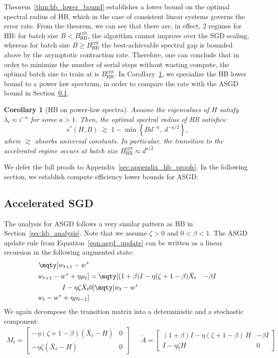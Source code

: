 \documentclass{article}
\def\w{{\mathbf{w}}}
\def\I{\mathbf{I}}
\newtheorem{corollary}{Corollary}
\begin{document}
Theorem~\ref{thm:hb_lower_bound} establishes a lower bound on the optimal spectral radius of HB, which in the case of consistent linear systems governs the error rate. From the theorem, we can see that there are, in effect, $2$ regimes for HB: for batch size $B < B_{\mathrm{HB}}^{\mathrm{crit}}$, the algorithm cannot improve over the SGD scaling, whereas for batch size $B \geq B_{\mathrm{HB}}^{\mathrm{crit}}$ the best-achievable spectral gap is bounded above by the asymptotic contraction rate. Therefore, one can conclude that in order to minimize the number of serial steps without wasting compute, the optimal batch size to train at is $B_{\mathrm{HB}}^{\mathrm{crit}}$. In Corollary~\ref{cor:hb_power_law}, we specialize the HB lower bound to a power law spectrum, in order to compare the rate with the ASGD bound in Section~\ref{sec:asgd_analysis}.
\begin{corollary}[HB on power-law spectra]
\label{cor:hb_power_law}
Assume the eigenvalues of $H$ satisfy $\lambda_i \eqsim i^{-a}$ for some $a>1$. Then, the optimal spectral radius of HB satisfies:
\[
s^*(H,B)
\;\gtrsim\;
1 - \min\!\left\{
B d^{-a},\ d^{-a/2}
\right\},
\]
where $\gtrsim$ absorbs universal constants.
In particular, the transition to the accelerated regime occurs at batch size $
B_{\mathrm{HB}}^{\mathrm{crit}}
\eqsim
d^{a/2}$
\end{corollary}
We defer the full proofs to Appendix~\ref{sec:appendix_hb_proofs}. In the following section, we establish compute efficiency lower bounds for ASGD.
\subsection{Accelerated SGD}
\label{sec:asgd_analysis}
The analysis for ASGD follows a very similar pattern as HB in Section~\ref{sec:hb_analysis}. 
Note that we assume $\zeta>0$ and $0 < \beta < 1$. The ASGD update rule from Equation~\ref{eqn:asgd_update} can be written as a linear recursion in the following augmented state:
\begin{align}
\label{eqn:rec_vec_asgd}
    \mqty[w_{t+1} - w^* \\w_{t+1} - w^* + \eta \mu_t] &= \mqty[(1+\beta)I - \eta(\zeta + 1-\beta)\bar{X}_t & -\beta I\\I - \eta \zeta \bar{X}_t & 0]\mqty[w_{t} - w^* \\w_{t} - w^* + \eta \mu_{t-1}]
\end{align}
We again decompose the transition matrix into a deterministic and a stochastic component:
\begin{align*}
    M_t
=
\begin{bmatrix}
-\eta(\zeta + 1 - \beta)(\bar X_t - H) & 0 \\
-\eta \zeta (\bar X_t - H) & 0
\end{bmatrix}
&&
\tilde{A}
=
\begin{bmatrix}
(1+\beta)I - \eta(\zeta + 1 - \beta)\,H & -\beta I \\
I - \eta \zeta H & 0
\end{bmatrix}
\end{align*}
\end{document}
